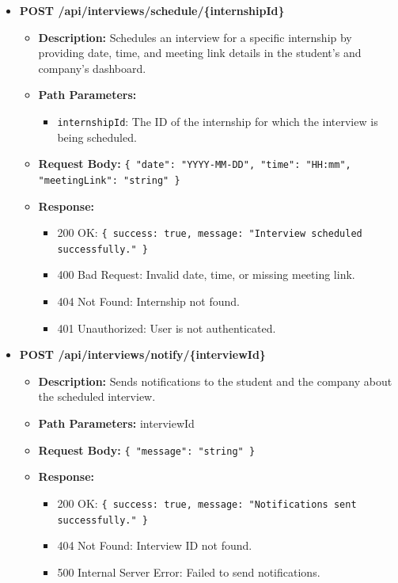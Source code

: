\begin{itemize}
    \item \textbf{POST /api/interviews/schedule/\{internshipId\}}  
    \begin{itemize}
        \item \textbf{Description:} Schedules an interview for a specific internship by providing date, time, and meeting link details in the student's and company's dashboard.
        \item \textbf{Path Parameters:} 
        \begin{itemize}
            \item \texttt{internshipId}: The ID of the internship for which the interview is being scheduled.
        \end{itemize}
        \item \textbf{Request Body:} 
        \texttt{\{ 
            "date": "YYYY-MM-DD", 
            "time": "HH:mm", 
            "meetingLink": "string" 
        \}}
        \item \textbf{Response:}
        \begin{itemize}
            \item 200 OK: \texttt{\{ success: true, message: "Interview scheduled successfully." \}}
            \item 400 Bad Request: Invalid date, time, or missing meeting link.
            \item 404 Not Found: Internship not found.
            \item 401 Unauthorized: User is not authenticated.
        \end{itemize}
    \end{itemize}


    \item \textbf{POST /api/interviews/notify/\{interviewId\}}  
    \begin{itemize}
        \item \textbf{Description:} Sends notifications to the student and the company about the scheduled interview.
        \item \textbf{Path Parameters:} interviewId
        \item \textbf{Request Body:} 
        \texttt{\{ 
            "message": "string"
        \}}
        \item \textbf{Response:}
        \begin{itemize}
            \item 200 OK: \texttt{\{ success: true, message: "Notifications sent successfully." \}}
            \item 404 Not Found: Interview ID not found.
            \item 500 Internal Server Error: Failed to send notifications.
        \end{itemize}
    \end{itemize}



\end{itemize}
